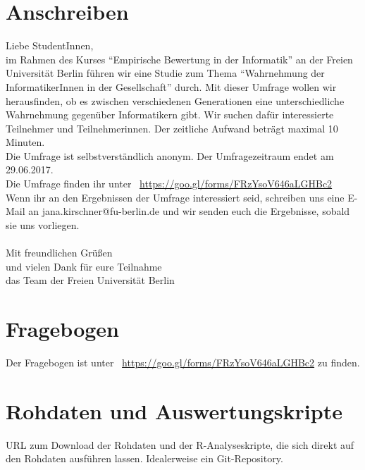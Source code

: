 \documentclass[de]{agse-empir-report}\usepackage[]{graphicx}\usepackage[]{color}
\begin{document}



\appendix

\section{Anschreiben}

Liebe StudentInnen,\\
im Rahmen des Kurses “Empirische Bewertung in der Informatik” an der Freien Universität Berlin führen wir eine Studie zum Thema “Wahrnehmung der InformatikerInnen in der Gesellschaft” durch. Mit dieser Umfrage wollen wir herausfinden, ob es zwischen verschiedenen Generationen eine unterschiedliche Wahrnehmung gegenüber Informatikern gibt. Wir suchen dafür interessierte Teilnehmer und Teilnehmerinnen. Der zeitliche Aufwand beträgt maximal 10 Minuten.\\
Die Umfrage ist selbstverständlich anonym. Der Umfragezeitraum endet am 29.06.2017.\\

Die Umfrage finden ihr  unter ~\url{https://goo.gl/forms/FRzYsoV646aLGHBc2} \\

Wenn ihr an den Ergebnissen der Umfrage interessiert seid, schreiben uns eine E-Mail an jana.kirschner@fu-berlin.de und wir senden euch die Ergebnisse, sobald sie uns vorliegen.\\ \\

Mit freundlichen Grüßen\\
und vielen Dank für eure Teilnahme\\ 
das Team der Freien Universität Berlin\\



\section{Fragebogen}

Der Fragebogen ist unter ~\url{https://goo.gl/forms/FRzYsoV646aLGHBc2} zu finden.


\section{Rohdaten und Auswertungskripte}

URL zum Download der Rohdaten und der R-Analyseskripte, die sich direkt auf den
Rohdaten ausführen lassen.
Idealerweise ein Git-Repository.
\end{document}
